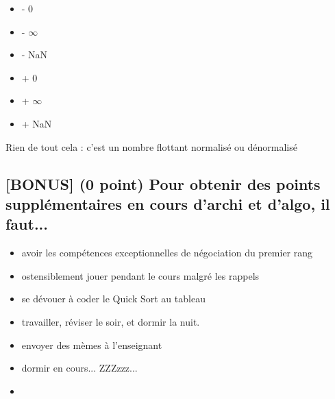 \documentclass[11pt,a4paper]{article}
\begin{document}
\begin{table}[h!]
  \centering
  \begin{minipage}{0.45\textwidth}
\begin{itemize}
  \item[\CaseCoche] - 0            \phantom{(} \\
  \item[\CaseCoche] - $ \infty $   \phantom{(} \\  
  \item[\CaseCoche] - NaN          \phantom{(} \\
\end{itemize}
  \end{minipage}
  \hfillx
  \begin{minipage}{0.45\textwidth}
    \centering
\begin{itemize}
  \item[\CaseCoche] + 0           \phantom{(} \\
  \item[\CaseCoche] + $ \infty $  \phantom{(} \\
  \item[\CaseCoche] + NaN         \phantom{(} \\
\end{itemize}
  \end{minipage}
\end{table}

\begin{center}
\CaseCoche

{ \large Rien de tout cela : c'est un nombre flottant normalisé ou dénormalisé }
\end{center}

\bigskip


\subsection{[BONUS] (0 point) Pour obtenir des points supplémentaires en cours d'archi et d'algo, il faut... }

\begin{itemize}
  \item[\CaseCoche] avoir les compétences exceptionnelles de négociation du premier rang \\
  \item[\CaseCoche] ostensiblement jouer pendant le cours malgré les rappels \\
  \item[\CaseCoche] se dévouer à coder le Quick Sort au tableau \\
  \item[\CaseCoche] travailler, réviser le soir, et dormir la nuit. \\
  \item[\CaseCoche] envoyer des mèmes à l'enseignant \\
  \item[\CaseCoche] dormir en cours... ZZZzzz... \\
  \item[\CaseCoche] \phantom{autre :} \\
\end{itemize}
\end{document}
